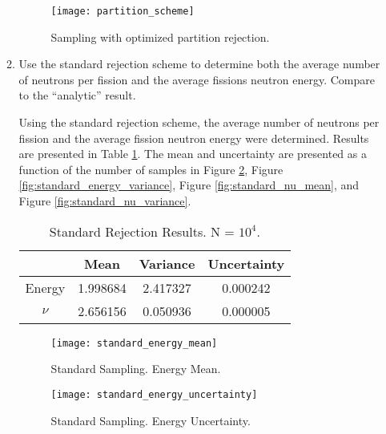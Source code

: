 \documentclass{article}
\begin{document}
\begin{enumerate}
\begin{enumerate}
        \begin{figure}
          \centering
          \texttt{[image: partition\_scheme]}
          \caption{Sampling with optimized partition rejection.}
          \label{fig:partition_scheme}
        \end{figure}

      \item 
        \label{part:standard}
        Use the standard rejection scheme to determine both the average
        number of neutrons per fission and the average fissions neutron
        energy. Compare to the ``analytic'' result.
        
        Using the standard rejection scheme, the average number of neutrons
        per fission and the average fission neutron energy were determined.
        Results are presented in Table \ref{tab:standard}. The mean and 
        uncertainty are presented as a function of the number of samples in 
        Figure \ref{fig:standard_energy_mean}, Figure 
        \ref{fig:standard_energy_variance}, Figure \ref{fig:standard_nu_mean},
        and Figure \ref{fig:standard_nu_variance}. 

        \begin{table}[H]
          \caption{Standard Rejection Results. N = $10^4$.}
          \label{tab:standard}
          \begin{center}
          \begin{tabular}{cccc}
            & Mean & Variance & Uncertainty \\
            \midrule
            Energy & 1.998684&  2.417327&  0.000242\\
            $\nu$  & 2.656156&  0.050936&  0.000005
          \end{tabular}
          \end{center}
        \end{table}

        \begin{figure}[H]
          \centering
          \texttt{[image: standard\_energy\_mean]}
          \caption{Standard Sampling. Energy Mean.}
          \label{fig:standard_energy_mean}
        \end{figure}

        \begin{figure}[H]
          \centering
          \texttt{[image: standard\_energy\_uncertainty]}
          \caption{Standard Sampling. Energy Uncertainty.}
          \label{fig:standard_energy_uncertainty}
        \end{figure}


\end{enumerate}
\end{enumerate}
\end{document}
